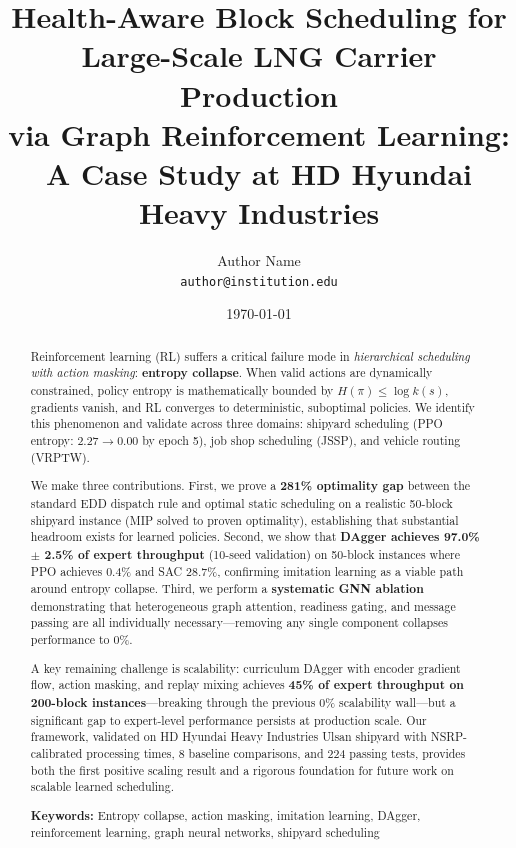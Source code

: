 \documentclass[11pt,a4paper]{article}
\title{\textbf{Health-Aware Block Scheduling for Large-Scale LNG Carrier Production\\via Graph Reinforcement Learning: A Case Study at HD Hyundai Heavy Industries}}
\author{
  Author Name\\
  \texttt{author@institution.edu}
}
\date{\today}
\begin{document}
\maketitle

\begin{abstract}
Reinforcement learning (RL) suffers a critical failure mode in \textit{hierarchical scheduling with action masking}: \textbf{entropy collapse}. When valid actions are dynamically constrained, policy entropy is mathematically bounded by $H(\pi) \leq \log k(s)$, gradients vanish, and RL converges to deterministic, suboptimal policies. We identify this phenomenon and validate across three domains: shipyard scheduling (PPO entropy: $2.27 \to 0.00$ by epoch 5), job shop scheduling (JSSP), and vehicle routing (VRPTW).

We make three contributions. First, we prove a \textbf{281\% optimality gap} between the standard EDD dispatch rule and optimal static scheduling on a realistic 50-block shipyard instance (MIP solved to proven optimality), establishing that substantial headroom exists for learned policies. Second, we show that \textbf{DAgger achieves 97.0\% $\pm$ 2.5\% of expert throughput} (10-seed validation) on 50-block instances where PPO achieves 0.4\% and SAC 28.7\%, confirming imitation learning as a viable path around entropy collapse. Third, we perform a \textbf{systematic GNN ablation} demonstrating that heterogeneous graph attention, readiness gating, and message passing are all individually necessary---removing any single component collapses performance to 0\%.

A key remaining challenge is scalability: curriculum DAgger with encoder gradient flow, action masking, and replay mixing achieves \textbf{45\% of expert throughput on 200-block instances}---breaking through the previous 0\% scalability wall---but a significant gap to expert-level performance persists at production scale. Our framework, validated on HD Hyundai Heavy Industries Ulsan shipyard with NSRP-calibrated processing times, 8 baseline comparisons, and 224 passing tests, provides both the first positive scaling result and a rigorous foundation for future work on scalable learned scheduling.

\vspace{0.5em}
\noindent\textbf{Keywords:} Entropy collapse, action masking, imitation learning, DAgger, reinforcement learning, graph neural networks, shipyard scheduling
\end{abstract}
\end{document}
